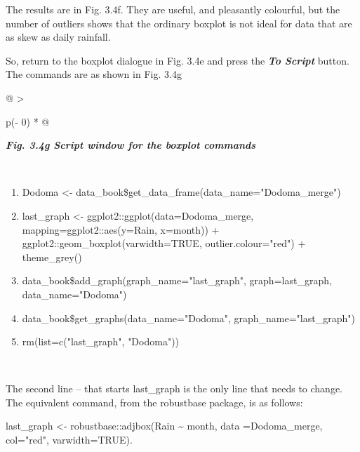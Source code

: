 \documentclass[
  letterpaper,
  DIV=11,
  numbers=noendperiod]{scrreprt}
\begin{document}
The results are in Fig. 3.4f. They are useful, and pleasantly colourful,
but the number of outliers shows that the ordinary boxplot is not ideal
for data that are as skew as daily rainfall.

So, return to the boxplot dialogue in Fig. 3.4e and press the
\textbf{\emph{To Script}} button. The commands are as shown in Fig. 3.4g

\begin{longtable}[]{@{}
  >{\raggedright\arraybackslash}p{(\columnwidth - 0\tabcolsep) * }@{}}
\toprule\noalign{}
\begin{minipage}[b]{\linewidth}\raggedright
\textbf{\emph{Fig. 3.4g Script window for the boxplot commands}}
\end{minipage} \\
\midrule\noalign{}
\endhead
\bottomrule\noalign{}
\endlastfoot
\begin{minipage}[t]{\linewidth}\raggedright
\begin{enumerate}
\def\labelenumi{\arabic{enumi}.}
\item
  Dodoma \textless-
  data\_book\$get\_data\_frame(data\_name="Dodoma\_merge")
\item
  last\_graph \textless- ggplot2::ggplot(data=Dodoma\_merge,
  mapping=ggplot2::aes(y=Rain, x=month)) +
  ggplot2::geom\_boxplot(varwidth=TRUE, outlier.colour="red") +
  theme\_grey()
\item
  data\_book\$add\_graph(graph\_name="last\_graph", graph=last\_graph,
  data\_name="Dodoma")
\item
  data\_book\$get\_graphs(data\_name="Dodoma",
  graph\_name="last\_graph")
\item
  rm(list=c("last\_graph", "Dodoma"))
\end{enumerate}
\end{minipage} \\
\end{longtable}

The second line -- that starts last\_graph is the only line that needs
to change. The equivalent command, from the robustbase package, is as
follows:

last\_graph \textless- robustbase::adjbox(Rain \textasciitilde{} month,
data =Dodoma\_merge, col="red", varwidth=TRUE).
\end{document}

